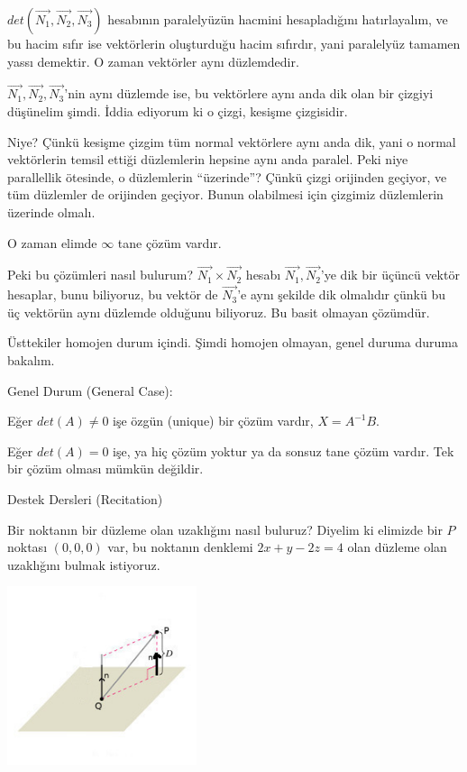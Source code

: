 \documentclass[12pt,fleqn]{article}\usepackage{../../common}
\begin{document}
$det(\vec{N_1},\vec{N_2},\vec{N_3})$ hesabının paralelyüzün hacmini
hesapladığını hatırlayalım, ve bu hacim sıfır ise vektörlerin oluşturduğu hacim
sıfırdır, yani paralelyüz tamamen yassı demektir. O zaman vektörler aynı
düzlemdedir.

$\vec{N_1},\vec{N_2},\vec{N_3}$'nin aynı düzlemde ise, bu vektörlere aynı
anda dik olan bir çizgiyi düşünelim şimdi. İddia ediyorum ki o çizgi,
kesişme çizgisidir.

Niye? Çünkü kesişme çizgim tüm normal vektörlere aynı anda dik, yani o
normal vektörlerin temsil ettiği düzlemlerin hepsine aynı anda
paralel. Peki niye parallellik ötesinde, o düzlemlerin ``üzerinde''? Çünkü
çizgi orijinden geçiyor, ve tüm düzlemler de orijinden geçiyor. Bunun
olabilmesi için çizgimiz düzlemlerin üzerinde olmalı.

O zaman elimde $\infty$ tane çözüm vardır. 

Peki bu çözümleri nasıl bulurum? $\vec{N_1} \times \vec{N_2}$ hesabı
$\vec{N_1},\vec{N_2}$'ye dik bir üçüncü vektör hesaplar, bunu biliyoruz, bu
vektör de $\vec{N_3}$'e aynı şekilde dik olmalıdır çünkü bu üç vektörün
aynı düzlemde olduğunu biliyoruz. Bu basit olmayan çözümdür.

Üsttekiler homojen durum içindi. Şimdi homojen olmayan, genel duruma duruma
bakalım.

Genel Durum (General Case):

Eğer $det(A) \ne 0$ işe özgün (unique) bir çözüm vardır, $X = A^{-1}B$. 

Eğer $det(A) = 0$ işe, ya hiç çözüm yoktur ya da sonsuz tane çözüm
vardır. Tek bir çözüm olması mümkün değildir. 

Destek Dersleri (Recitation)

Bir noktanın bir düzleme olan uzaklığını nasıl buluruz? Diyelim ki elimizde
bir $P$ noktası $(0,0,0)$ var, bu noktanın denklemi $2x + y - 2z = 4$ olan
düzleme olan uzaklığını bulmak istiyoruz.

\includegraphics[width=15em]{4_6.jpg}
\end{document}
